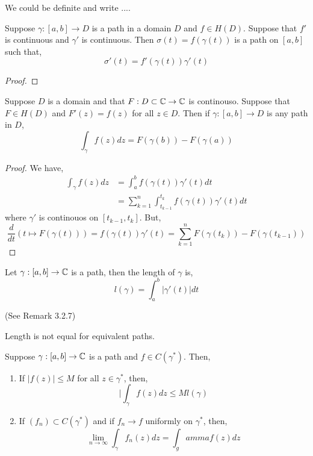 \documentclass[12pt]{amsart}
\begin{document}
\begin{remark}
    We could be definite and write .... 
\end{remark}


\begin{lemma}[W 3.7]
    Suppose $\gamma: [a,b] \to D$ is a path in a domain $D$ and $f \in H(D)$. Suppose that $f'$ is continuous and $\gamma'$ is continuous. Then $\sigma(t) = f(\gamma(t))$ is a path on $[a,b]$ such that, 
    \[ \sigma'(t) = f'(\gamma(t))\gamma'(t)\]
\end{lemma}
\begin{proof}
\end{proof}

\begin{theorem}
    Suppose $D$ is a domain and that $F: D \subset \mathbb C \to \mathbb C$ is continouso. Suppose that $F \in H(D)$ and $F'(z) = f(z)$ for all $z \in D$. Then if $\gamma: [a,b] \to D$ is any path in $D$, 
    \[ \int_\gamma f(z) dz = F(\gamma(b)) - F(\gamma(a))\]
\end{theorem}

\begin{proof}
    We have, 
    \begin{align*}
        \int_\gamma f(z)dz &= \int_a^b f(\gamma(t))\gamma'(t) dt \\
        &= \sum_{k=1}^n \int_{t_{k-1}}^{t_k} f(\gamma(t))\gamma'(t)dt 
    \end{align*}
    where $\gamma'$ is continouos on $[t_{k-1}, t_k]$. But, 
    \[ \frac{d}{dt}( t\mapsto F(\gamma(t))) = f(\gamma(t))\gamma'(t) = \sum_{k=1}^n F(\gamma(t_k))-F(\gamma(t_{k-1}))\]
\end{proof}

\begin{definition}
    Let $\gamma: [a,b] \to \mathbb C$ is a path, then the length of $\gamma$ is,
    \[l(\gamma) = \int_{a}^b |\gamma'(t)|dt\]
\end{definition}
(See Remark 3.2.7)

\begin{warning}
    Length is not equal for equivalent paths. 
\end{warning}

\begin{proposition}
    Suppose $\gamma: [a,b] \to \mathbb C$ is a path and $f \in C(\gamma^*)$. Then, 
    \begin{enumerate}
        \item If $|f(z)| \leq M$ for all $z \in \gamma^*$, then, 
        \[ |\int_\gamma f(z)dz \leq Ml(\gamma)\]
        \item If $(f_n) \subset C(\gamma^*)$ and if $f_n \to f$ uniformly on $\gamma^*$, then, 
        \[ \lim_{n \to \infty} \int_\gamma f_n(z)dz = \int_gamma f(z)dz\]
    \end{enumerate}
\end{proposition}
\end{document}
